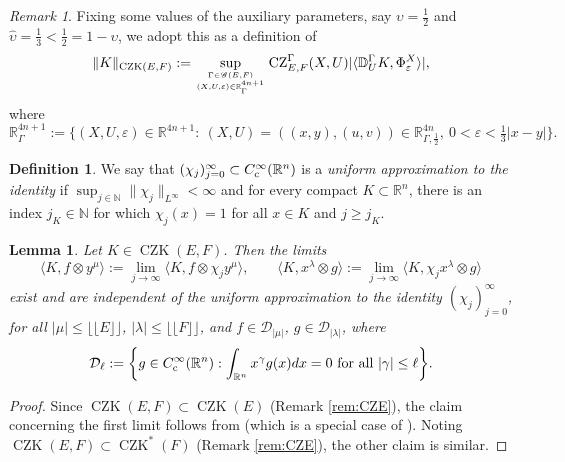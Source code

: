 \documentclass[11pt, reqno]{amsart}
\newtheorem{lemma}[theorem]{Lemma}
\theoremstyle{definition}
\newtheorem{definition}[theorem]{Definition}
\theoremstyle{remark}
\newtheorem{remark}[theorem]{Remark}
\numberwithin{equation}{section}
\newcommand{\N}{\mathbb N}
\newcommand{\R}{\mathbb R}
\newcommand{\eps}{\varepsilon}
\newcommand{\Floor}[1]{\lfloor\!\lfloor #1 \rfloor\!\rfloor}
\newcommand{\pair}[2]{\langle #1, #2 \rangle}
\newcommand{\abs}[1]{|#1|}
\newcommand{\Norm}[2]{\|#1\|_{#2}}
\begin{document}
\begin{remark}
Fixing some values of the auxiliary parameters, say $\upsilon=\frac12$ and $\hat\upsilon=\frac13<\frac12=1-\upsilon$, we adopt this as a definition of
\begin{equation*}
  \Norm{K}{\operatorname{CZK}(E,F)}
  :=\sup_{\genfrac{}{}{0pt}{}{\Gamma\in\mathscr G(E,F)}{(X,U,\eps)\in\R^{4n+1}_{\Gamma}  }}
  \operatorname{CZ}_{E,F}^{\Gamma}(X,U) \abs{ \pair{\mathbb D_U^\Gamma K }{ \Phi_\eps^X }},
\end{equation*}
where
\begin{equation*}
  \R^{4n+1}_{\Gamma} := \Big\{ (X,U,\eps)\in\R^{4n+1}:\  (X,U)=((x,y),(u,v))\in\R^{4n}_{\Gamma,\frac12},\ 0<\eps<\tfrac13\abs{x-y}\Big\}.
\end{equation*}
\end{remark}

\begin{definition}\label{def:UAI}
We say that $(\chi_j)_{j=0}^\infty\subset C_{\rm c}^\infty(\R^n)$ is a {\em uniform approximation to the identity} if $\sup_{j\in\N}\Norm{\chi_j}{L^\infty}<\infty$ and
for every compact $K\subset\R^n$, there is an index $j_K\in\N$ for which $\chi_j(x)=1$ for all $x\in K$ and $j\geq j_K$.
\end{definition}

\begin{lemma}\label{lem:T1}
Let $K\in\operatorname{CZK}(E,F)$. Then the limits
\begin{equation}\label{eq:T1lim}
  \pair{K}{f\otimes y^{\mu}}
  :=\lim_{j\to\infty}\pair{K}{f\otimes\chi_j y^{\mu}},\qquad
  \pair{K}{x^{\lambda}\otimes g}
  :=\lim_{j\to\infty}\pair{K}{\chi_j x^{\lambda}\otimes g}
\end{equation}
exist and are independent of the uniform approximation to the identity $(\chi_j)_{j=0}^\infty$, for all $\abs{\mu}\leq\Floor{E}$, $\abs{\lambda}\leq\Floor{F}$,
 and $f\in\mathcal D_{\abs{\mu}}$, $g\in\mathcal D_{\abs{\lambda}}$, where
 \begin{equation*}
  \mathcal D_{\ell}:=\bigg\{ g\in C_{\rm c}^\infty(\R^n): \int_{\R^n}x^{\gamma}g(x)dx =0 \text{ for all }\abs{\gamma}\leq\ell\bigg\}.
\end{equation*}
\end{lemma}

\begin{proof}
Since $\operatorname{CZK}(E,F)\subset\operatorname{CZK}(E)$ (Remark \ref{rem:CZE}), the claim concerning the first limit follows from \cite[Lemma 6.9]{BHYY:1c} (which is a special case of \cite[Lemma 2.2.12]{tor}).
Noting $\operatorname{CZK}(E,F)\subset\operatorname{CZK}^*(F)$ (Remark \ref{rem:CZE}), the other claim is similar.
\end{proof}
\end{document}
